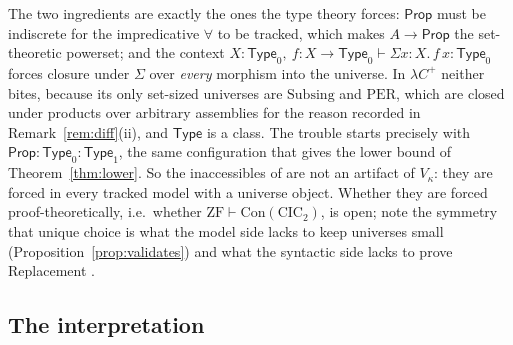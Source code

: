 \documentclass[10pt]{article}
\newcommand{\Prop}{\mathsf{Prop}}
\newcommand{\Type}{\mathsf{Type}}
\newcommand{\CIC}{\mathrm{CIC}}
\newcommand{\ZF}{\mathrm{ZF}}
\newcommand{\Con}{\mathrm{Con}}
\begin{document}
The two ingredients are exactly the ones the type theory forces: $\Prop$
must be indiscrete for the impredicative $\forall$ to be tracked, which
makes $A\to\Prop$ the set-theoretic powerset; and the context
$X{:}\Type_0,\ f{:}X\to\Type_0\vdash\Sigma x{:}X.\,f\,x:\Type_0$ forces
closure under $\Sigma$ over \emph{every} morphism into the universe. In
$\lambda C^+$ neither bites, because its only set-sized universes are
$\mathrm{Subsing}$ and $\mathrm{PER}$, which are closed under products
over arbitrary assemblies for the reason recorded in
Remark~\ref{rem:diff}(ii), and $\Type$ is a class. The trouble starts
precisely with $\Prop:\Type_0:\Type_1$, the same configuration that gives
the lower bound of Theorem~\ref{thm:lower}. So the inaccessibles of
\cite{werner97,barras10,timanysozeau17} are not an artifact of $V_\kappa$:
they are forced in every tracked model with a universe object. Whether
they are forced proof-theoretically, i.e.\ whether $\ZF\vdash\Con(\CIC_2)$,
is open; note the symmetry that unique choice is what the model side
lacks to keep universes small (Proposition~\ref{prop:validates}) and what
the syntactic side lacks to prove Replacement \cite{barras10}.

\subsection{The interpretation}
\end{document}
